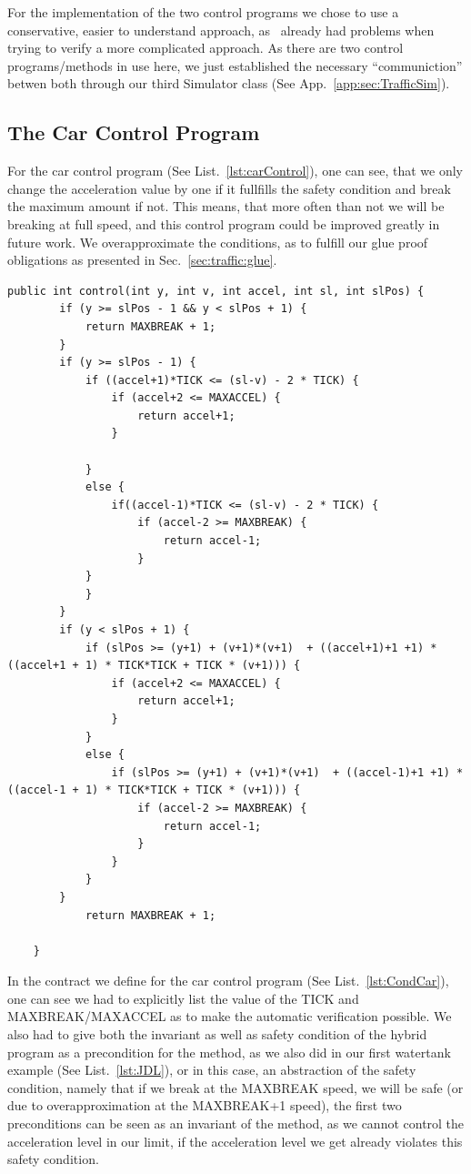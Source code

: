 For the implementation of the two control programs we chose to use a conservative, easier to understand approach, as \key~already had problems when trying to verify a more complicated approach. As there are two control programs/methods in use here, we just established the necessary ``communiction'' betwen both through our third Simulator class (See App.~\ref{app:sec:TrafficSim}). 

\subsection{The Car Control Program}
\label{subsec:traffic:car}
For the car control program (See List.~\ref{lst:carControl}), one can see, that we only change the acceleration value by one if it fullfills the safety condition and break the maximum amount if not. This means, that more often than not we will be breaking at full speed,  and this control program could be improved greatly in future work. We overapproximate the conditions, as to fulfill our glue proof obligations as presented in Sec.~\ref{sec:traffic:glue}.

\begin{lstlisting}[label=lst:carControl]
public int control(int y, int v, int accel, int sl, int slPos) {
		if (y >= slPos - 1 && y < slPos + 1) {
			return MAXBREAK + 1;
		}
		if (y >= slPos - 1) {
			if ((accel+1)*TICK <= (sl-v) - 2 * TICK) {
				if (accel+2 <= MAXACCEL) {
					return accel+1;
				}
				
			}
			else {
				if((accel-1)*TICK <= (sl-v) - 2 * TICK) {
					if (accel-2 >= MAXBREAK) {
						return accel-1;
					}
			}
			}
		}
		if (y < slPos + 1) {
			if (slPos >= (y+1) + (v+1)*(v+1)  + ((accel+1)+1 +1) * ((accel+1 + 1) * TICK*TICK + TICK * (v+1))) {
				if (accel+2 <= MAXACCEL) {
					return accel+1;
				}
			}
			else {
				if (slPos >= (y+1) + (v+1)*(v+1)  + ((accel-1)+1 +1) * ((accel-1 + 1) * TICK*TICK + TICK * (v+1))) {
					if (accel-2 >= MAXBREAK) {
						return accel-1;
					}
				}
			}
		}
			return MAXBREAK + 1;
		
	}
\end{lstlisting}

In the contract we define for the car control program (See List.~\ref{lst:CondCar}),  one can see we had to explicitly list the value of the TICK and MAXBREAK/MAXACCEL as to make the automatic verification possible. We also had to give both the invariant as well as safety condition of the hybrid program as a precondition for the method, as we also did in our first watertank example (See List.~\ref{lst:JDL}), or in this case, an abstraction of the safety condition, namely that if we break at the MAXBREAK speed, we will be safe (or due to overapproximation at the MAXBREAK+1 speed), the first two preconditions can be seen as an invariant of the method, as we cannot control the acceleration level in our limit, if the acceleration level we get already violates this safety condition.

